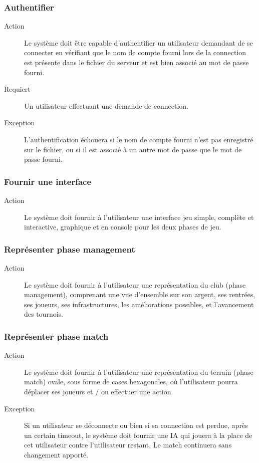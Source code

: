 \documentclass[a4paper]{article}
\begin{document}
\subsubsection{Authentifier}
\begin{description}
\item[Action] Le système doit être capable d'authentifier un utilisateur demandant de se connecter en vérifiant que le nom de compte fourni lors de la connection est présente dans le fichier du serveur et est bien associé au mot de passe fourni.
\item[Requiert] Un utilisateur effectuant une demande de connection.
\item[Exception] L'authentification échouera si le nom de compte fourni n'est pas enregistré sur le fichier, ou si il est associé à un autre mot de passe que le mot de passe fourni.
\end{description}

\subsubsection{Fournir une interface}
\begin{description}
\item[Action] Le système doit fournir à l'utilisateur une interface jeu simple, complète et interactive, graphique et en console pour les deux phases de jeu.
\end{description}

\subsubsection{Représenter phase management}
\begin{description}
\item[Action] Le système doit fournir à l'utilisateur une représentation du \gls{club} (phase management), comprenant une vue d'ensemble sur son argent, ses rentrées, ses joueurs, ses infrastructures, les améliorations possibles, et l'avancement des tournois.
\end{description}

\subsubsection{Représenter phase match}
\begin{description}
\item[Action] Le système doit fournir à l'utilisateur une représentation du terrain (phase match) ovale, sous forme de cases hexagonales, où l'utilisateur pourra déplacer ses joueurs et / ou effectuer une action.
\item[Exception] Si un utilisateur se déconnecte ou bien si sa connection est perdue, après un certain timeout, le système doit fournir une IA qui jouera à la place de cet utilisateur contre l'utilisateur restant. Le match continuera sans changement apporté.
\end{description}
\end{document}
